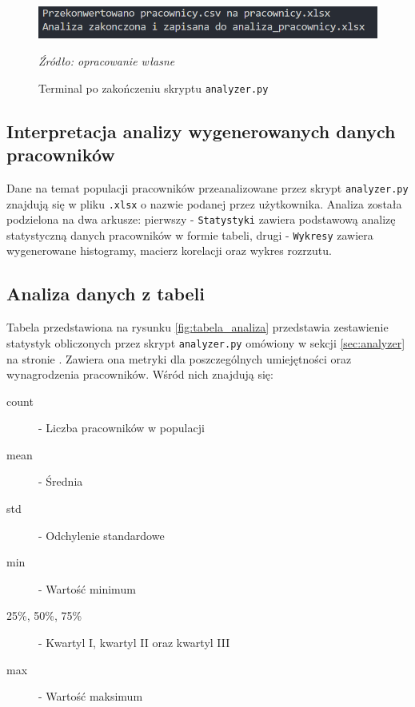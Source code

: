         \begin{figure}[H]
            \centering
            \includegraphics[width=\linewidth]{chapters/Images/terminal_analyzer.png}
            \cprotect\caption{Terminal po zakończeniu skryptu \verb|analyzer.py|}
            \textit{Źródło: opracowanie własne}
        \end{figure}

    \subsection{Interpretacja analizy wygenerowanych danych pracowników}\label{subsec:analiza_wejscie}
    \par Dane na temat populacji pracowników przeanalizowane przez skrypt \verb|analyzer.py| znajdują się w pliku \verb|.xlsx| o nazwie podanej przez użytkownika. Analiza została podzielona na dwa arkusze: pierwszy - \verb|Statystyki| zawiera podstawową analizę statystyczną danych pracowników w formie tabeli, drugi - \verb|Wykresy| zawiera wygenerowane histogramy, macierz korelacji oraz wykres rozrzutu.

    \subsection{Analiza danych z tabeli}\label{subsec:tabela_populacja}
    \par Tabela przedstawiona na rysunku \ref{fig:tabela_analiza} przedstawia zestawienie statystyk obliczonych przez skrypt \verb|analyzer.py| omówiony w sekcji \ref{sec:analyzer} na stronie \pageref{sec:analyzer}. Zawiera ona metryki dla poszczególnych umiejętności oraz wynagrodzenia pracowników. Wśród nich znajdują się:
    \begin{description}
        \item[count] - Liczba pracowników w populacji
        \item[mean] - Średnia
        \item[std] - Odchylenie standardowe
        \item[min] - Wartość minimum
        \item[25\%, 50\%, 75\%] - Kwartyl I, kwartyl II oraz kwartyl III
        \item[max] - Wartość maksimum
    \end{description}

